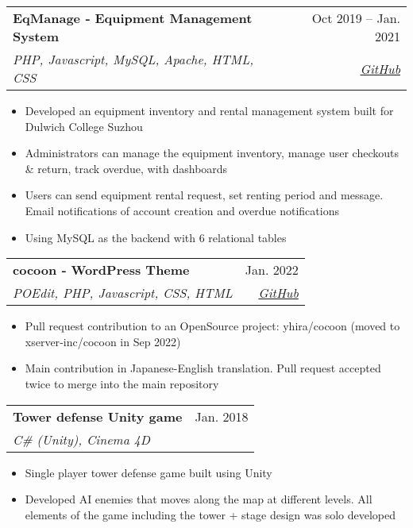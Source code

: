 \documentclass[a4paper,11pt]{article}
\makeatletter
\newcommand{\resumeItem}[1]{
    \item\small{
            {\footnotesize#1 \vspace{-4pt}}
    }
}
\newcommand{\resumeSubheading}[4]{
    \vspace{-2pt}\item
    \begin{tabular*}{0.97\textwidth}[t]{l@{\extracolsep{\fill}}r}
        \textbf{#1} & \fontsize{10}{10}\selectfont#2 \\
        \textit{\footnotesize#3} & \textit{\footnotesize #4} \\
    \end{tabular*}\vspace{-7pt}
}
\newcommand{\resumeProjectHeading}[2]{
    \item
    \begin{tabular*}{0.97\textwidth}{l@{\extracolsep{\fill}}r}
        \small#1 & #2 \\
    \end{tabular*}\vspace{-7pt}
}
\newcommand{\resumeSubHeadingListEnd}{\end{itemize}}
\newcommand{\resumeItemListStart}{\begin{itemize}[leftmargin=0.2in]}
\newcommand{\resumeItemListEnd}{\end{itemize}\vspace{-5pt}}
\makeatother
\begin{document}
\resumeSubheading
{EqManage ‐ Equipment Management System}{Oct 2019 -- Jan. 2021}
{PHP, Javascript, MySQL, Apache, HTML, CSS}{\href{https://github.com/YukiKume/EqManage}{GitHub}}
\resumeItemListStart
\resumeItem{Developed an equipment inventory and rental management system built for Dulwich College Suzhou}
\resumeItem{Administrators can manage the equipment inventory, manage user checkouts \& return, track overdue, with dashboards}
\resumeItem{Users can send equipment rental request, set renting period and message. Email notifications of account creation and overdue notifications}
\resumeItem{Using MySQL as the backend with 6 relational tables}
\resumeItemListEnd


\resumeSubheading
{cocoon ‐ WordPress Theme}{Jan. 2022}
{POEdit, PHP, Javascript, CSS, HTML}{\href{https://github.com/xserver-inc/cocoon}{GitHub}}
\resumeItemListStart
\resumeItem{Pull request contribution to an OpenSource project: yhira/cocoon (moved to xserver‐inc/cocoon in Sep 2022)}
\resumeItem{Main contribution in Japanese-English translation. Pull request accepted twice to merge into the main repository}
\resumeItemListEnd


\resumeSubheading
{Tower defense Unity game}{Jan. 2018}
{C\# (Unity), Cinema 4D}{}
\resumeItemListStart
\resumeItem{Single player tower defense game built using Unity}
\resumeItem{Developed AI enemies that moves along the map at different levels. All elements of the game including the tower + stage design was solo developed}
\resumeItemListEnd



%
\end{document}
